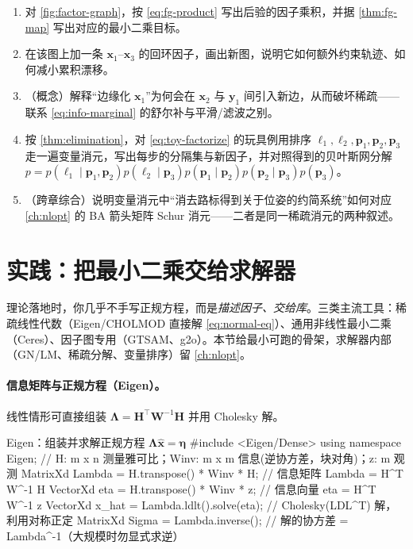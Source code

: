 \begin{practice}
\begin{enumerate}
  \item 对 \cref{fig:factor-graph}，按 \cref{eq:fg-product} 写出后验的因子乘积，并据 \cref{thm:fg-map} 写出对应的最小二乘目标。
  \item 在该图上加一条 $\mathbf{x}_1$–$\mathbf{x}_3$ 的回环因子，画出新图，说明它如何额外约束轨迹、如何减小累积漂移。
  \item （概念）解释“边缘化 $\mathbf{x}_1$”为何会在 $\mathbf{x}_2$ 与 $\mathbf{y}_1$ 间引入新边，从而破坏稀疏——联系 \cref{eq:info-marginal} 的舒尔补与平滑/滤波之别。
  \item 按 \cref{thm:elimination}，对 \cref{eq:toy-factorize} 的玩具例用排序 $\boldsymbol{\ell}_1,\boldsymbol{\ell}_2,\mathbf{p}_1,\mathbf{p}_2,\mathbf{p}_3$ 走一遍变量消元，写出每步的分隔集与新因子，并对照得到的贝叶斯网分解 $p=p(\boldsymbol{\ell}_1\mid\mathbf{p}_1,\mathbf{p}_2)p(\boldsymbol{\ell}_2\mid\mathbf{p}_3)p(\mathbf{p}_1\mid\mathbf{p}_2)p(\mathbf{p}_2\mid\mathbf{p}_3)p(\mathbf{p}_3)$。
  \item （跨章综合）说明变量消元中“消去路标得到关于位姿的约简系统”如何对应 \cref{ch:nlopt} 的 BA 箭头矩阵 Schur 消元——二者是同一稀疏消元的两种叙述。
\end{enumerate}
\end{practice}

\section{实践：把最小二乘交给求解器}
\label{sec:est-practice}

理论落地时，你几乎不手写正规方程，而是\emph{描述因子、交给库}。三类主流工具：稀疏线性代数（Eigen/CHOLMOD 直接解 \cref{eq:normal-eq}）、通用非线性最小二乘（Ceres）、因子图专用（GTSAM、g2o）。本节给最小可跑的骨架，求解器内部（GN/LM、稀疏分解、变量排序）留 \cref{ch:nlopt}。

\paragraph{信息矩阵与正规方程（Eigen）。}
线性情形可直接组装 $\boldsymbol{\Lambda}=\mathbf{H}^\top\mathbf{W}^{-1}\mathbf{H}$ 并用 Cholesky 解。

\begin{codebox}[C++]{Eigen：组装并求解正规方程 $\boldsymbol{\Lambda}\hat{\mathbf{x}}=\boldsymbol{\eta}$}
#include <Eigen/Dense>
using namespace Eigen;
// H: m x n 测量雅可比；Winv: m x m 信息(逆协方差，块对角)；z: m 观测
MatrixXd Lambda = H.transpose() * Winv * H;   // 信息矩阵 Lambda = H^T W^-1 H
VectorXd eta    = H.transpose() * Winv * z;    // 信息向量 eta = H^T W^-1 z
VectorXd x_hat  = Lambda.ldlt().solve(eta);    // Cholesky(LDL^T) 解，利用对称正定
MatrixXd Sigma  = Lambda.inverse();            // 解的协方差 = Lambda^-1（大规模时勿显式求逆）
\end{codebox}

